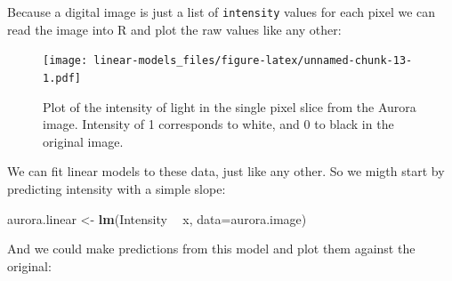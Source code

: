 \documentclass[]{article}
\newenvironment{Shaded}{\begin{snugshade}}{\end{snugshade}}
\newcommand{\KeywordTok}[1]{\textcolor[rgb]{0.13,0.29,0.53}{\textbf{#1}}}
\newcommand{\DataTypeTok}[1]{\textcolor[rgb]{0.13,0.29,0.53}{#1}}
\newcommand{\DecValTok}[1]{\textcolor[rgb]{0.00,0.00,0.81}{#1}}
\newcommand{\StringTok}[1]{\textcolor[rgb]{0.31,0.60,0.02}{#1}}
\newcommand{\OperatorTok}[1]{\textcolor[rgb]{0.81,0.36,0.00}{\textbf{#1}}}
\newcommand{\NormalTok}[1]{#1}
\theoremstyle{definition}
\theoremstyle{definition}
\theoremstyle{definition}
\theoremstyle{remark}
\begin{document}
Because a digital image is just a list of \texttt{intensity} values for
each pixel we can read the image into R and plot the raw values like any
other:

\begin{Shaded}
\end{Shaded}

\begin{figure}
\centering
\texttt{[image: linear-models\_files/figure-latex/unnamed-chunk-13-1.pdf]}
\caption{\label{fig:unnamed-chunk-13}Plot of the intensity of light in the
single pixel slice from the Aurora image. Intensity of 1 corresponds to
white, and 0 to black in the original image.}
\end{figure}

We can fit linear models to these data, just like any other. So we migth
start by predicting intensity with a simple slope:

\begin{Shaded}
\begin{Highlighting}[]
\NormalTok{aurora.linear <-}\StringTok{ }\KeywordTok{lm}\NormalTok{(Intensity }\OperatorTok{~}\StringTok{ }\NormalTok{x, }\DataTypeTok{data=}\NormalTok{aurora.image)}
\end{Highlighting}
\end{Shaded}

And we could make predictions from this model and plot them against the
original:
\end{document}
